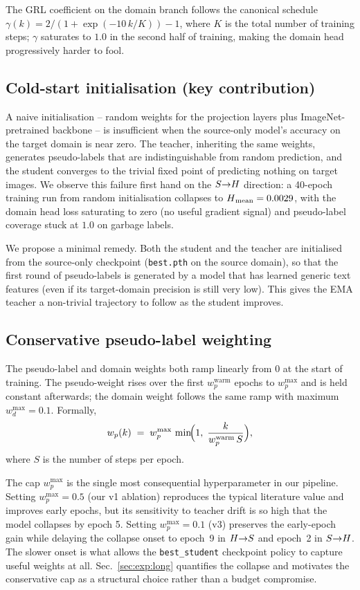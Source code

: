 The GRL coefficient on the domain branch follows the canonical schedule
$\gamma(k) = 2/(1+\exp(-10\,k/K)) - 1$, where $K$ is the total number
of training steps; $\gamma$ saturates to $1.0$ in the second half of
training, making the domain head progressively harder to fool.

\subsection{Cold-start initialisation (key contribution)}
\label{sec:method:coldstart}
A naive initialisation -- random weights for the projection layers plus
ImageNet-pretrained backbone -- is insufficient when the source-only
model's accuracy on the target domain is near zero. The teacher,
inheriting the same weights, generates pseudo-labels that are
indistinguishable from random prediction, and the student converges to
the trivial fixed point of predicting nothing on target images. We
observe this failure first hand on the $S{\rightarrow}H$ direction: a 40-epoch
training run from random initialisation collapses to $H\textsubscript{mean} = 0.0029$,
with the domain head loss saturating to zero (no useful gradient signal)
and pseudo-label coverage stuck at $1.0$ on garbage labels.

We propose a minimal remedy. Both the student and the teacher are
initialised from the source-only checkpoint
(\texttt{best.pth} on the source domain), so that the first round of
pseudo-labels is generated by a model that has learned generic text
features (even if its target-domain precision is still very low). This
gives the EMA teacher a non-trivial trajectory to follow as the student
improves.

\subsection{Conservative pseudo-label weighting}
\label{sec:method:weighting}
The pseudo-label and domain weights both ramp linearly from $0$ at
the start of training. The pseudo-weight rises over the first
$w_p^{\mathrm{warm}}$ epochs to $w_p^{\max}$ and is held constant
afterwards; the domain weight follows the same ramp with maximum
$w_d^{\max}=0.1$. Formally,
\begin{equation}
  w_p(k) \;=\; w_p^{\max}\,\min\!\Bigl(1,\;\frac{k}{w_p^{\mathrm{warm}}\,S}\Bigr),
  \label{eq:ramp}
\end{equation}
where $S$ is the number of steps per epoch.

The cap $w_p^{\max}$ is the single most consequential hyperparameter
in our pipeline. Setting $w_p^{\max}=0.5$ (our v1 ablation) reproduces
the typical literature value and improves early epochs, but its
sensitivity to teacher drift is so high that the model collapses by
epoch 5. Setting $w_p^{\max}=0.1$ (v3) preserves the early-epoch
gain while delaying the collapse onset to epoch~9 in $H{\rightarrow}S$ and
epoch~2 in $S{\rightarrow}H$. The slower onset is what allows the
\texttt{best\_student} checkpoint policy to capture useful weights at
all. Sec.~\ref{sec:exp:long} quantifies the collapse and motivates
the conservative cap as a structural choice rather than a budget
compromise.
